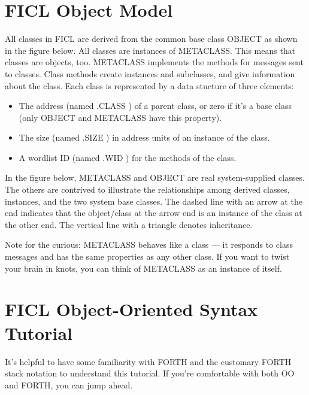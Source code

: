 \section{FICL Object Model}
All classes in FICL are derived from the common base class OBJECT as
shown in the figure below. All classes are instances of METACLASS. This
means that classes are objects, too. METACLASS implements the methods
for messages sent to classes. Class methods create instances and
subclasses, and give information about the class. Each class is
represented by a data stucture of three elements:
\begin{itemize}[noitemsep]
	\item The address (named .CLASS ) of a parent class, or zero if
	it's a base class (only OBJECT and METACLASS have this
	property).

	\item The size (named .SIZE ) in address units of an instance
	of the class.

	\item A wordlist ID (named .WID ) for the methods of the class.
\end{itemize}
In the figure below, METACLASS and OBJECT are real system-supplied
classes. The others are contrived to illustrate the relationships among
derived classes, instances, and the two system base classes. The dashed
line with an arrow at the end indicates that the object/class at the
arrow end is an instance of the class at the other end. The vertical
line with a triangle denotes inheritance.

Note for the curious: METACLASS behaves like a class — it responds to
class messages and has the same properties as any other class. If you
want to twist your brain in knots, you can think of METACLASS as an
instance of itself.


\section{FICL Object-Oriented Syntax Tutorial}
It's helpful to have some familiarity with FORTH and the customary
FORTH stack notation to understand this tutorial. If you're comfortable
with both OO and FORTH, you can jump ahead.


